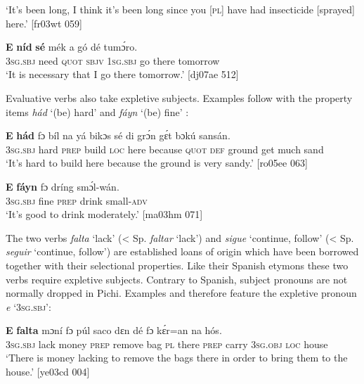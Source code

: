 \glt ‘It’s been long, I think it’s been long since you [\textsc{pl}] have had insecticide 
[sprayed] here.’ [fr03wt 059]
\z


\ea%
    \label{ex:key:1145}
    \gll \textbf{E}   \textbf{níd}    \textbf{sé}    mék    a    gó  dé    tumɔ́ro.\\
\textsc{3sg.sbj}  need  \textsc{quot}    \textsc{sbjv}    \textsc{1sg.sbj}  go  there  tomorrow\\

\glt ‘It is necessary that I go there tomorrow.’ [dj07ae 512]
\z

Evaluative verbs also take expletive subjects. Examples follow with the property items \textit{hád} ‘(be) hard’  and \textit{fáyn} ‘(be) fine’ : 


\ea%
    \label{ex:key:1146}
    \gll \textbf{E}    \textbf{hád}    fɔ  bíl    na  yá    bikɔs  sé    di  grɔ́n 
gɛ́t  bɔkú  sansán.\\
\textsc{3sg.sbj}  hard  \textsc{prep}  build  \textsc{loc}  here    because  \textsc{quot}    \textsc{def}  ground
get  much  sand\\

\glt ‘It’s hard to build here because the ground is very sandy.’ [ro05ee 063]
\z


\ea%
    \label{ex:key:1147}
    \gll \textbf{E}    \textbf{fáyn} fɔ  dríng  smɔ́l-wán.\\
\textsc{3sg.sbj}  fine    \textsc{prep}  drink  small\textsc{{}-adv}\\

\glt ‘It’s good to drink moderately.’ [ma03hm 071]
\z

The two verbs \textit{falta} ‘lack’ (< Sp. \textit{faltar} ‘lack’) and \textit{sigue} ‘continue, follow’ (< Sp. \textit{seguir} ‘continue, follow’) are established loans of  origin which have been borrowed together with their selectional properties. Like their Spanish etymons these two verbs require expletive subjects. Contrary to Spanish, subject pronouns are not normally dropped in Pichi. Examples  and  therefore feature the expletive pronoun \textit{e} \textsc{‘3sg.sbj’}:


\ea%
    \label{ex:key:1148}
    \gll \textbf{E}    \textbf{falta}  mɔní  fɔ  púl    saco    dɛn  dé    fɔ
kɛ́r=an    na  hós.\\
\textsc{3sg.sbj}  lack    money  \textsc{prep}  remove  bag    \textsc{pl}  there  \textsc{prep}
carry \textsc{3sg.obj}  \textsc{loc}  house\\
\glt ‘There is money lacking to remove the bags there in order to bring 
them to the house.’ [ye03cd 004]
\z


